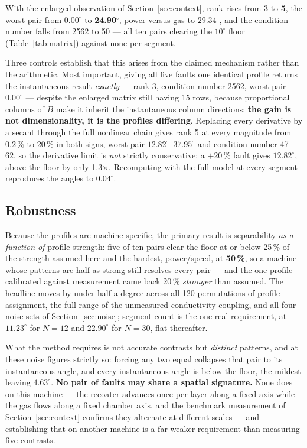 \documentclass[final,5p,times,twocolumn]{elsarticle}
\begin{document}
With the enlarged observation of Section~\ref{sec:context}, rank rises from 3 to
\textbf{5}, the worst pair from $0.00^\circ$ to \textbf{24.90$^\circ$}, power
versus gas to $29.34^\circ$, and the condition number falls from 2562 to 50 ---
all ten pairs clearing the $10^\circ$ floor (Table~\ref{tab:matrix}) against none
per segment.

Three controls establish that this arises from the claimed mechanism rather than
the arithmetic. Most important, giving all five faults one identical profile
returns the instantaneous result \emph{exactly} --- rank 3, condition number 2562,
worst pair $0.00^\circ$ --- despite the enlarged matrix still having 15 rows,
because proportional columns of $B$ make it inherit the instantaneous column
directions: \textbf{the gain is not dimensionality, it is the profiles
differing}. Replacing every derivative by a secant through the full nonlinear
chain gives rank 5 at every magnitude from 0.2\,\% to 20\,\% in both signs, worst
pair $12.82^\circ$--$37.95^\circ$ and condition number 47--62, so the derivative
limit is \emph{not} strictly conservative: a $+20\,\%$ fault gives $12.82^\circ$,
above the floor by only 1.3$\times$. Recomputing with the full model at every
segment reproduces the angles to $0.04^\circ$.

\subsection{Robustness}
\label{sec:robust}

Because the profiles are machine-specific, the primary result is separability
\emph{as a function of} profile strength: five of ten pairs clear the floor at or
below 25\,\% of the strength assumed here and the hardest, power/speed, at
\textbf{50\,\%}, so a machine whose patterns are half as strong still resolves
every pair --- and the one profile calibrated against measurement came back
20\,\% \emph{stronger} than assumed. The headline moves by under half a degree
across all 120 permutations of profile assignment, the full range of the
unmeasured conductivity coupling, and all four noise sets of
Section~\ref{sec:noise}; segment count is the one real requirement, at
$11.23^\circ$ for $N=12$ and $22.90^\circ$ for $N=30$, flat thereafter.

What the method requires is not accurate contrasts but \emph{distinct} patterns,
and at these noise figures strictly so: forcing any two equal collapses that pair
to its instantaneous angle, and every instantaneous angle is below the floor, the
mildest leaving $4.63^\circ$. \textbf{No pair of faults may share a spatial
signature.} None does on this machine --- the recoater advances once per layer
along a fixed axis while the gas flows along a fixed chamber axis, and the
benchmark measurement of Section~\ref{sec:context} confirms they alternate at
different scales --- and establishing that on another machine is a far weaker
requirement than measuring five contrasts.
\end{document}
